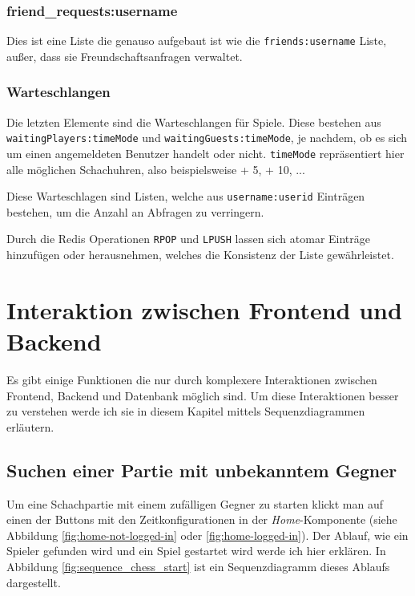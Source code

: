 \subsubsection{friend\_requests:username}
Dies ist eine Liste die genauso aufgebaut ist wie die \verb|friends:username| Liste, außer, dass sie Freundschaftsanfragen verwaltet.

\subsubsection{Warteschlangen}
\label{sec:Warteschlange}
Die letzten Elemente sind die Warteschlangen für Spiele. Diese bestehen aus \verb|waitingPlayers:timeMode| und \verb|waitingGuests:timeMode|, je nachdem, ob es sich um einen angemeldeten Benutzer handelt oder nicht. \verb|timeMode| repräsentiert hier alle möglichen Schachuhren, also beispielsweise  + 5\grqq ,  + 10\grqq , ...

Diese Warteschlagen sind Listen, welche aus \verb|username:userid| Einträgen bestehen, um die Anzahl an Abfragen zu verringern. 

Durch die Redis Operationen \verb|RPOP| und \verb|LPUSH| lassen sich atomar Einträge hinzufügen oder herausnehmen, welches die Konsistenz der Liste gewährleistet.
        \section{Interaktion zwischen Frontend und Backend}
Es gibt einige Funktionen die nur durch komplexere Interaktionen zwischen Frontend, Backend und Datenbank möglich sind. Um diese Interaktionen besser zu verstehen werde ich sie in diesem Kapitel mittels Sequenzdiagrammen erläutern.

\subsection{Suchen einer Partie mit unbekanntem Gegner}
\label{sec:game-suche}
Um eine Schachpartie mit einem zufälligen Gegner zu starten klickt man auf einen der Buttons mit den Zeitkonfigurationen in der \textit{Home}-Komponente (siehe Abbildung \ref{fig:home-not-logged-in} oder \ref{fig:home-logged-in}). Der Ablauf, wie ein Spieler gefunden wird und ein Spiel gestartet wird werde ich hier erklären. In Abbildung \ref{fig:sequence_chess_start} ist ein Sequenzdiagramm dieses Ablaufs dargestellt.

